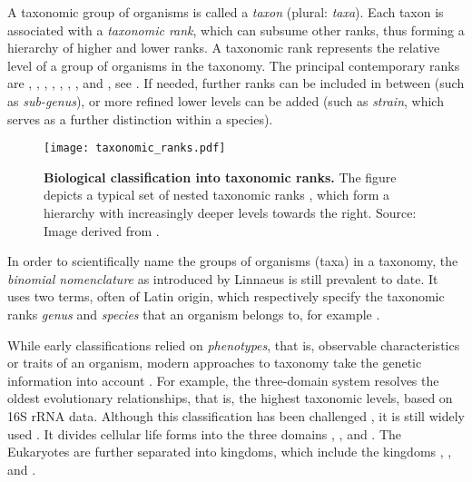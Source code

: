 A taxonomic group of organisms is called a \emph{taxon} (plural: \emph{taxa}).
Each taxon is associated with a \emph{taxonomic rank}, which can subsume other ranks,
thus forming a hierarchy of higher and lower ranks.
A taxonomic rank represents the relative level of a group of organisms in the taxonomy.
The principal contemporary ranks are , , , ,
, , , and ,
see .
If needed, further ranks can be included in between (such as \emph{sub-genus}),
or more refined lower levels can be added (such as \emph{strain}, which serves as a further distinction within a species).

\begin{figure}[hpbt]
    \centering
    \texttt{[image: taxonomic\_ranks.pdf]}
    \caption[Biological classification into taxonomic ranks]{
        \textbf{Biological classification into taxonomic ranks.}
        The figure depicts a typical set of nested taxonomic ranks \cite{Woese1990},
        which form a hierarchy with increasingly deeper levels towards the right.
        Source: Image derived from \cite{Halasz2007}.
    }
    \label{fig:taxonomic_ranks}
\end{figure}

In order to scientifically name the groups of organisms (taxa) in a taxonomy,
the \emph{binomial nomenclature} as introduced by Linnaeus is still prevalent to date.
It uses two terms, often of Latin origin,
which respectively specify the taxonomic ranks \emph{genus} and \emph{species} that an organism belongs to,
for example .

While early classifications relied on \emph{phenotypes}, that is, observable characteristics or traits of an organism,
modern approaches to taxonomy take the genetic information into account \cite{Mayr2002}.
For example, the three-domain system \cite{Woese1977,Woese1990} resolves the oldest evolutionary relationships,
that is, the highest taxonomic levels, based on 16S rRNA data.
Although this classification has been challenged \cite{Gupta1998,Mayr1998,Cavalier-Smith2002},
it is still widely used \cite{Hug2016}.
It divides cellular life forms into the three domains , , and .
The Eukaryotes are further separated into kingdoms,
which include the kingdoms , , and .

